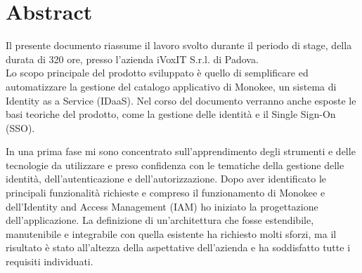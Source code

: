 
\cleardoublepage
{}
{}
\begingroup
\let\clearpage\relax
\let\cleardoublepage\relax
\let\cleardoublepage\relax

\chapter*{Abstract}

Il presente documento riassume il lavoro svolto durante il periodo di stage, della durata di 320 ore, presso l'azienda iVoxIT S.r.l. di Padova. \\
Lo scopo principale del prodotto sviluppato è quello di semplificare ed automatizzare la gestione del catalogo applicativo di Monokee, un sistema di Identity as a Service (IDaaS). Nel corso del documento verranno anche esposte le basi teoriche del prodotto, come la gestione delle identità e il Single Sign-On (SSO). 

In una prima fase mi sono concentrato sull'apprendimento degli strumenti e delle tecnologie da utilizzare e preso confidenza con le tematiche della gestione delle identità, dell'autenticazione e dell'autorizzazione. Dopo aver identificato le principali funzionalità richieste e compreso il funzionamento di Monokee e dell'Identity and Access Management (IAM) ho iniziato la progettazione dell'applicazione. La definizione di un'architettura che fosse estendibile, manutenibile e integrabile con quella esistente ha richiesto molti sforzi, ma il risultato è stato all'altezza della aspettative dell'azienda e ha soddisfatto tutte i requisiti individuati.
%
%

\endgroup			

\vfill


